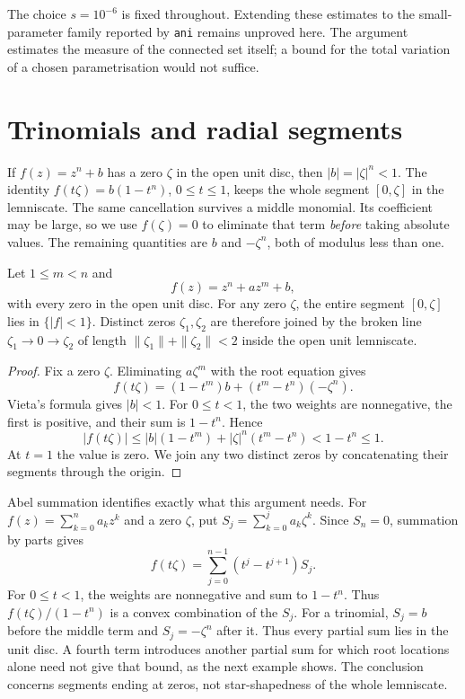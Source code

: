 \documentclass[11pt]{article}
\begin{document}
The choice $s=10^{-6}$ is fixed throughout. Extending these estimates to
the small-parameter family reported by \texttt{ani} remains unproved
here. The argument estimates the measure of the connected set itself;
a bound for the total variation of a chosen parametrisation would not
suffice.

\section{Trinomials and radial segments}\label{sec:trinomial}

If $f(z)=z^n+b$ has a zero $\zeta$ in the open unit disc, then
$|b|=|\zeta|^n<1$. The identity $f(t\zeta)=b(1-t^n)$, $0\le t\le1$,
keeps the whole segment $[0,\zeta]$ in the lemniscate.
The same cancellation survives a middle monomial. Its coefficient may
be large, so we use $f(\zeta)=0$ to eliminate that term \emph{before}
taking absolute values. The remaining quantities are $b$ and
$-\zeta^n$, both of modulus less than one.

\begin{theorem}
\label{res:trinomial-all-degree}
Let $1\le m<n$ and
\[
 f(z)=z^n+az^m+b,
\]
with every zero in the open unit disc.  For any zero $\zeta$, the entire
segment $[0,\zeta]$ lies in $\{|f|<1\}$.  Distinct zeros $\zeta_1,\zeta_2$
are therefore joined by the broken line $\zeta_1\to0\to\zeta_2$ of length
$\|\zeta_1\|+\|\zeta_2\|<2$ inside the open unit lemniscate.
\end{theorem}

\begin{proof}
Fix a zero $\zeta$. Eliminating $a\zeta^m$ with the root equation gives
\[
 f(t\zeta)=(1-t^m)b+(t^m-t^n)(-\zeta^n).
\]
Vieta's formula gives $|b|<1$. For $0\le t<1$, the two weights
are nonnegative, the first is positive, and their sum is $1-t^n$. Hence
\[
 |f(t\zeta)|\le |b|(1-t^m)+|\zeta|^n(t^m-t^n)<1-t^n\le1.
\]
At $t=1$ the value is zero. We join any two distinct zeros by concatenating
their segments through the origin.
\end{proof}

Abel summation identifies exactly what this argument needs. For
$f(z)=\sum_{k=0}^n a_kz^k$ and a zero $\zeta$, put
$S_j=\sum_{k=0}^j a_k\zeta^k$. Since $S_n=0$, summation by parts gives
\[
 f(t\zeta)=\sum_{j=0}^{n-1}(t^j-t^{j+1})S_j.
\]
For $0\le t<1$, the weights are nonnegative and sum to $1-t^n$.
Thus $f(t\zeta)/(1-t^n)$ is a convex combination of the $S_j$.
For a trinomial, $S_j=b$ before the middle term and $S_j=-\zeta^n$
after it. Thus every partial sum lies in the unit disc. A fourth term
introduces another partial sum for which root locations alone need not
give that bound, as the next example shows. The conclusion concerns
segments ending at zeros, not star-shapedness of the whole lemniscate.
\end{document}
